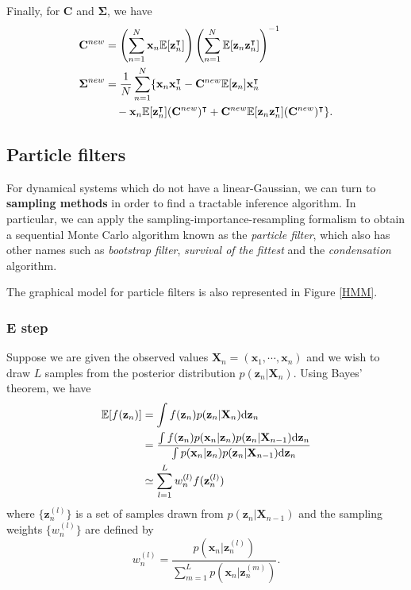 \documentclass[a4paper]{book}
\newcommand{\ud}{\mathrm{d}}
\renewcommand{\bf}{\mathbf}
\newcommand{\bb}{\mathbb}
\newcommand{\imp}[1]{\textit{#1}}
\newcommand{\bs}{\boldsymbol}
\begin{document}
Finally, for $\bf{C}$ and $\bs{\Sigma}$, we have
\begin{align}
	\bf{C}^{new} &= \left( \sum_{n=1}^N \bf{x}_n \bb{E}[\bf{z}_n^{\intercal}] \right)\left( \sum_{n=1}^N \bb{E}[\bf{z}_n\bf{z}_n^{\intercal}] \right)^{-1} \\
	\bs{\Sigma}^{new} &= \frac{1}{N} \sum_{n=1}^N \{ \bf{x}_n\bf{x}_n^{\intercal} -\bf{C}^{new}\bb{E}[\bf{z}_n]\bf{x}_n^{\intercal} \notag \\
	&\quad - \bf{x}_n \bb{E}[\bf{z}_n^{\intercal}](\bf{C}^{new})^{\intercal} + \bf{C}^{new}\bb{E}[\bf{z}_n\bf{z}_n^{\intercal}](\bf{C}^{new})^{\intercal}\}.		 
\end{align}
\subsection{Particle filters}
For dynamical systems which do not have a linear-Gaussian, we can turn to \textbf{sampling methods} in order to find a tractable inference algorithm. In particular, we can apply the sampling-importance-resampling formalism to obtain a sequential Monte Carlo algorithm known as the \imp{particle filter}, which also has other names such as \imp{bootstrap filter}, \imp{survival of the fittest} and the \imp{condensation} algorithm.

The graphical model for particle filters is also represented in Figure \ref{HMM}. 

\subsubsection{E step}
Suppose we are given the observed values $\bf{X}_n = (\bf{x}_1,\cdots,\bf{x}_n)$ and we wish to draw $L$ samples from the posterior distribution $p(\bf{z}_n|\bf{X}_n)$. Using Bayes' theorem, we have
\begin{align}
	\bb{E}[f(\bf{z}_n)] &= \int f(\bf{z}_n)p(\bf{z}_n|\bf{X}_n) \ud \bf{z}_n \notag\\
	&= \frac{\int f(\bf{z}_n)p(\bf{x}_n|\bf{z}_n)p(\bf{z}_n|\bf{X}_{n-1})\ud \bf{z}_n}{\int p(\bf{x}_n|\bf{z}_n)p(\bf{z}_n|\bf{X}_{n-1})\ud \bf{z}_n} \notag\\
	&\simeq \sum_{l=1}^L w_n^{(l)} f(\bf{z}_n^{(l)}) \label{PF1}
\end{align}
where $\{ \bf{z}_n^{(l)}\}$ is a set of samples drawn from $p(\bf{z}_n|\bf{X}_{n-1})$ and the sampling weights $\{ w_n^{(l)} \}$ are defined by
\begin{equation}
	w_n^{(l)} = \frac{p(\bf{x}_n|\bf{z}_n^{(l)})}{\sum_{m=1}^L p(\bf{x}_n|\bf{z}_n^{(m)})}.
\end{equation}
\end{document}
